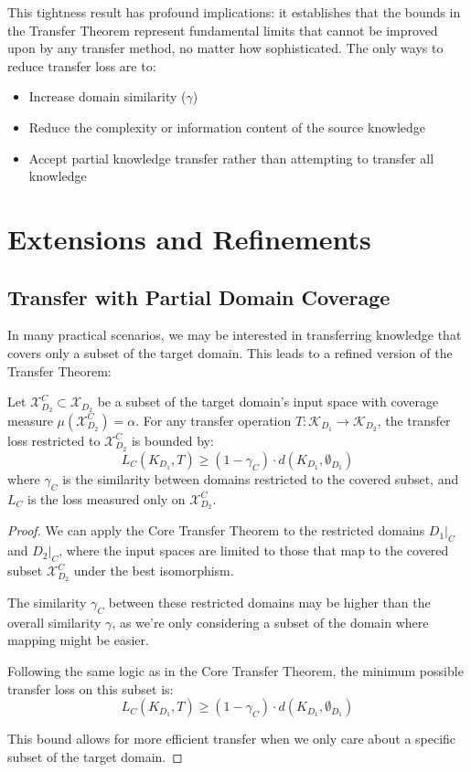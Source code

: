 This tightness result has profound implications: it establishes that the bounds in the Transfer Theorem represent fundamental limits that cannot be improved upon by any transfer method, no matter how sophisticated. The only ways to reduce transfer loss are to:
\begin{itemize}
    \item Increase domain similarity ($\gamma$)
    \item Reduce the complexity or information content of the source knowledge
    \item Accept partial knowledge transfer rather than attempting to transfer all knowledge
\end{itemize}

\section{Extensions and Refinements}

\subsection{Transfer with Partial Domain Coverage}

In many practical scenarios, we may be interested in transferring knowledge that covers only a subset of the target domain. This leads to a refined version of the Transfer Theorem:

\begin{theorem}
Let $\mathcal{X}_{D_2}^C \subset \mathcal{X}_{D_2}$ be a subset of the target domain's input space with coverage measure $\mu(\mathcal{X}_{D_2}^C) = \alpha$. For any transfer operation $T: \mathcal{K}_{D_1} \to \mathcal{K}_{D_2}$, the transfer loss restricted to $\mathcal{X}_{D_2}^C$ is bounded by:
\begin{equation}
L_C(K_{D_1}, T) \geq (1 - \gamma_C) \cdot d(K_{D_1}, \emptyset_{D_1})
\end{equation}
where $\gamma_C$ is the similarity between domains restricted to the covered subset, and $L_C$ is the loss measured only on $\mathcal{X}_{D_2}^C$.
\end{theorem}

\begin{proof}
We can apply the Core Transfer Theorem to the restricted domains $D_1|_C$ and $D_2|_C$, where the input spaces are limited to those that map to the covered subset $\mathcal{X}_{D_2}^C$ under the best isomorphism.

The similarity $\gamma_C$ between these restricted domains may be higher than the overall similarity $\gamma$, as we're only considering a subset of the domain where mapping might be easier.

Following the same logic as in the Core Transfer Theorem, the minimum possible transfer loss on this subset is:
\begin{equation}
L_C(K_{D_1}, T) \geq (1 - \gamma_C) \cdot d(K_{D_1}, \emptyset_{D_1})
\end{equation}

This bound allows for more efficient transfer when we only care about a specific subset of the target domain.
\end{proof}

